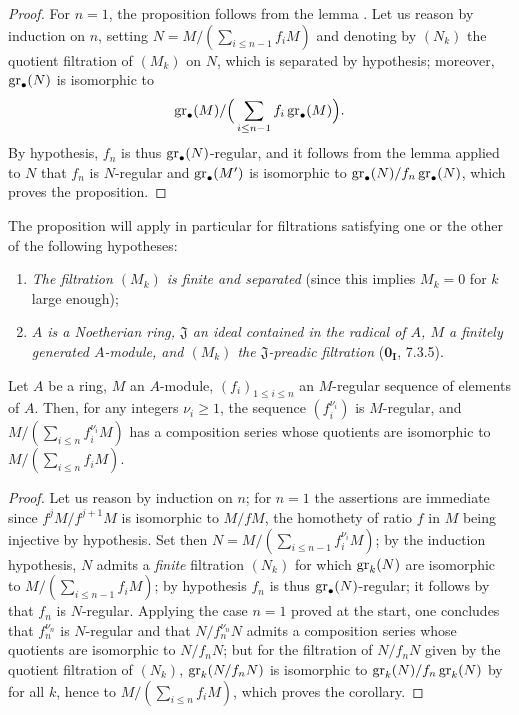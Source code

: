 \begin{proof}
For $n=1$, the proposition follows from the lemma .
Let us reason by induction on $n$, setting $N=M/(\sum_{i\leq n-1}f_iM)$ and denoting by $(N_k)$ the quotient filtration of $(M_k)$ on $N$, which is separated by hypothesis;
moreover, $\operatorname{gr}_\bullet(N)$ is isomorphic to
\[
  \operatorname{gr}_\bullet(M)/\Big(\sum_{i\leq n-1}f_i\operatorname{gr}_\bullet(M)\Big).
\]
By hypothesis, $f_n$ is thus $\operatorname{gr}_\bullet(N)$-regular, and it follows from the lemma  applied to $N$ that $f_n$ is $N$-regular and $\operatorname{gr}_\bullet(M')$ is isomorphic to $\operatorname{gr}_\bullet(N)/f_n\operatorname{gr}_\bullet(N)$, which proves the proposition.
\end{proof}

The proposition  will apply in particular for filtrations satisfying one or the other of the following hypotheses:
\begin{enumerate}
  \item[$1^\circ$] \emph{The filtration $(M_k)$ is finite and separated} (since this implies $M_k=0$ for $k$ large enough);
  \item[$2^\circ$] \emph{$A$ is a Noetherian ring, $\mathfrak{J}$ an ideal contained in the radical of $A$, $M$ a finitely generated $A$-module, and $(M_k)$ the $\mathfrak{J}$-preadic filtration} ($\mathbf{0_I}$, 7.3.5).
\end{enumerate}

\begin{corollary}[15.1.20]
\label{0.15.1.20}
Let $A$ be a ring, $M$ an $A$-module, $(f_i)_{1\leq i\leq n}$ an $M$-regular sequence of elements of $A$.
Then, for any integers $\nu_i\geq 1$, the sequence $(f_i^{\nu_i})$ is $M$-regular, and $M/(\sum_{i\leq n}f_i^{\nu_i}M)$ has a composition series whose quotients are isomorphic to $M/(\sum_{i\leq n}f_iM)$.
\end{corollary}

\begin{proof}
Let us reason by induction on $n$;
for $n=1$ the assertions are immediate since $f^jM/f^{j+1}M$ is isomorphic to $M/fM$, the homothety of ratio $f$ in $M$ being injective by hypothesis.
Set then $N=M/(\sum_{i\leq n-1}f_i^{\nu_i}M)$;
by the induction hypothesis, $N$ admits a \emph{finite} filtration $(N_k)$ for which $\operatorname{gr}_k(N)$ are isomorphic to $M/(\sum_{i\leq n-1}f_iM)$;
by hypothesis $f_n$ is thus $\operatorname{gr}_\bullet(N)$-regular;
it follows by  that $f_n$ is $N$-regular.
Applying the case $n=1$ proved at the start, one concludes that $f_n^{\nu_n}$ is $N$-regular and that $N/f_n^{\nu_n}N$ admits a composition series whose quotients are isomorphic to $N/f_nN$;
but for the filtration of $N/f_nN$ given by the quotient filtration of $(N_k)$, $\operatorname{gr}_k(N/f_nN)$ is isomorphic to $\operatorname{gr}_k(N)/f_n\operatorname{gr}_k(N)$ by  for all $k$, hence to $M/(\sum_{i\leq n}f_iM)$, which proves the corollary.
\end{proof}

